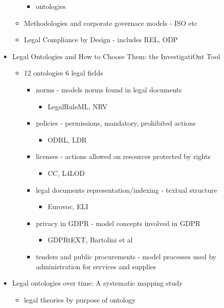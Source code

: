 \begin{itemize}
\begin{itemize}
\begin{itemize}
		\item ontologies
		\end{itemize}
	\item Methodologies and corporate governace models - ISO etc
	\item Legal Compliance by Design - includes REL, ODP
	\end{itemize}
\item Legal Ontologies and How to Choose Them: the InvestigatiOnt Tool
	\begin{itemize}
	\item 12 ontologies 6 legal fields
		\begin{itemize}
		\item norms - models norms found in legal documents
			\begin{itemize}
			\item LegalRuleML, NRV
			\end{itemize}
		\item policies - permissions, mandatory, prohibited actions
			\begin{itemize}
			\item ODRL, LDR
			\end{itemize}
		\item licenses - actions allowed on resources protected by rights
			\begin{itemize}
			\item CC, L4LOD
			\end{itemize}
		\item legal documents representation/indexing - textual structure
			\begin{itemize}
			\item Eurovoc, ELI
			\end{itemize}
		\item privacy in GDPR - model concepts involved in GDPR
			\begin{itemize}
			\item GDPRtEXT, Bartolini et al
			\end{itemize}
		\item tenders and public procurements - model processes used by administration for services and supplies
		\end{itemize}
	\end{itemize}
\item Legal ontologies over time: A systematic mapping study
	\begin{itemize}
	\item legal theories by purpose of ontology
		\begin{itemize}

\end{itemize}
\end{itemize}
\end{itemize}
